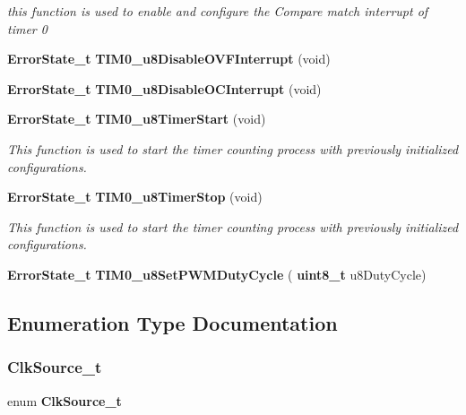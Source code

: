 \begin{DoxyCompactItemize}
\begin{DoxyCompactList}\small\item\em this function is used to enable and configure the Compare match interrupt of timer 0 \end{DoxyCompactList}\item 
\textbf{ Error\+State\+\_\+t} \textbf{ T\+I\+M0\+\_\+u8\+Disable\+O\+V\+F\+Interrupt} (void)
\item 
\textbf{ Error\+State\+\_\+t} \textbf{ T\+I\+M0\+\_\+u8\+Disable\+O\+C\+Interrupt} (void)
\item 
\textbf{ Error\+State\+\_\+t} \textbf{ T\+I\+M0\+\_\+u8\+Timer\+Start} (void)
\begin{DoxyCompactList}\small\item\em This function is used to start the timer counting process with previously initialized configurations. \end{DoxyCompactList}\item 
\textbf{ Error\+State\+\_\+t} \textbf{ T\+I\+M0\+\_\+u8\+Timer\+Stop} (void)
\begin{DoxyCompactList}\small\item\em This function is used to start the timer counting process with previously initialized configurations. \end{DoxyCompactList}\item 
\textbf{ Error\+State\+\_\+t} \textbf{ T\+I\+M0\+\_\+u8\+Set\+P\+W\+M\+Duty\+Cycle} (\textbf{ uint8\+\_\+t} u8\+Duty\+Cycle)
\end{DoxyCompactItemize}


\subsection{Enumeration Type Documentation}
\mbox{\label{_t_i_m_e_r0__interface_8h_ab9c5e315444772abc479b22b3556fe44}} 
\subsubsection{Clk\+Source\+\_\+t}
{\footnotesize\ttfamily enum \textbf{ Clk\+Source\+\_\+t}}

